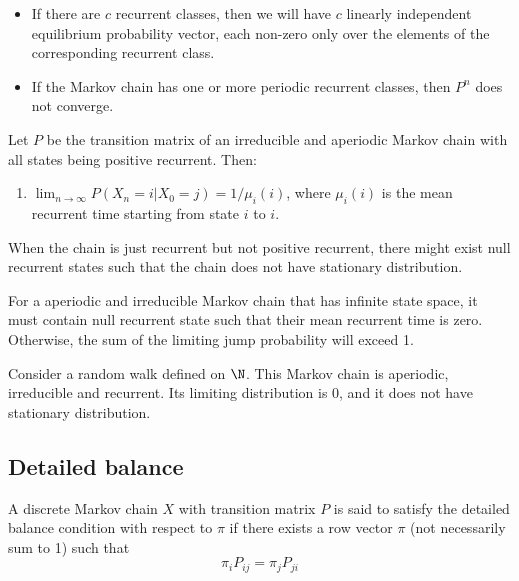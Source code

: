 \begin{refsection}
\begin{remark}\cite[170]{gallager2013stochastic}
\begin{itemize}
	\item If there are $c$ recurrent classes, then we will have $c$ linearly independent equilibrium probability vector, each non-zero only over the elements of the corresponding recurrent class.
	\item If the Markov chain has one or more periodic recurrent classes, then $P^n$ does not converge.
\end{itemize}
\end{remark}

\begin{theorem}
	\cite[130]{privault2013understanding}Let $P$ be the transition matrix of an irreducible and aperiodic Markov chain with all states being positive recurrent. Then:
	\begin{enumerate}
		\item $\lim_{n \to \infty} P(X_n=i|X_0=j) = 1/\mu_i(i)$, where $\mu_i(i)$ is the mean recurrent time starting from state $i$ to $i$.
	\end{enumerate}
\end{theorem}


\begin{remark}
When the chain is just recurrent but not positive recurrent, there might exist null recurrent states such that the chain does not have stationary distribution.
\end{remark}

\begin{remark}
For a aperiodic and irreducible Markov chain that has infinite state space, it must contain null recurrent state such that their mean recurrent time is zero. Otherwise, the sum of the limiting jump probability will exceed 1. 
	
\end{remark}


\begin{example}
Consider a random walk defined on $\N$. This Markov chain is aperiodic, irreducible and recurrent. Its limiting distribution is 0, and it does not have stationary distribution.
\end{example}



\subsection{Detailed balance}
\begin{definition}\cite[230]{robert2013monte}
A discrete Markov chain $X$ with transition matrix $P$ is said to satisfy the detailed balance condition with respect to $\pi$ if there exists a row vector $\pi$ (not necessarily sum to 1) such that
$$\pi_i P_{ij} = \pi_j P_{ji}$$ 	
\end{definition}






\end{refsection}
